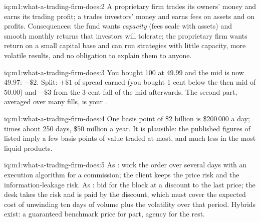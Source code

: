 \begin{solution}{iq:m1:what-a-trading-firm-does:2}
A proprietary firm trades its owners' money and earns its trading profit; a
 trades investors' money and earns fees on assets and on profits.
Consequences: the fund wants \emph{capacity} (fees scale with assets) and
smooth monthly returns that investors will tolerate; the proprietary firm
wants return on a small capital base and can run strategies with little
capacity, more volatile results, and no obligation to explain them to anyone.
\end{solution}

\begin{solution}{iq:m1:what-a-trading-firm-does:3}
You bought 100 at 49.99 and the mid is now 49.97: $-\$2$. Split: $+\$1$ of
spread earned (you bought 1 cent below the then mid of 50.00) and $-\$3$ from
the 3-cent fall of the mid afterwards. The second part, averaged over many
fills, is your .
\end{solution}

\begin{solution}{iq:m1:what-a-trading-firm-does:4}
One basis point of \$2 billion is \$200\,000 a day; times about 250 days,
\$50 million a year. It is plausible: the published figures of listed  imply a few basis points of value traded at most, and much less in
the most liquid products.
\end{solution}

\begin{solution}{iq:m1:what-a-trading-firm-does:5}
As : work the order over several days with an execution algorithm for a
commission; the client keeps the price risk and the information-leakage
risk. As : bid for the block at a discount to the last price; the
desk takes the risk and is paid by the discount, which must cover the
expected cost of unwinding ten days of volume plus the volatility over that
period. Hybrids exist: a guaranteed benchmark price for part, agency for the
rest.
\end{solution}

